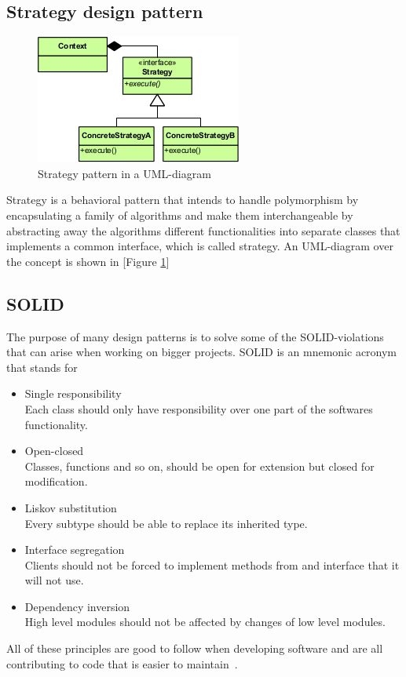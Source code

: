 \documentclass[conference, a4paper]{IEEEtran}
\begin{document}
\subsection{Strategy design pattern}
\label{sec:Strategy}
\begin{figure}[ht!]
	\centering
	\includegraphics[scale=0.7]{Strategy_Pattern_in_UML.png}
	\caption{Strategy pattern in a UML-diagram}
	\label{fig:Strategy}
\end{figure}
Strategy is a behavioral pattern that intends to handle polymorphism by encapsulating a family of algorithms and make them interchangeable by abstracting away the algorithms different functionalities into separate classes that implements a common interface, which is called strategy. An UML-diagram over the concept is shown in [Figure \ref{fig:Strategy}]
\\
\subsection{SOLID}
The purpose of many design patterns is to solve some of the SOLID-violations that can arise when working on bigger projects. SOLID is an mnemonic acronym that stands for
\begin{itemize}
    \item Single responsibility \\
    Each class should only have responsibility over one part of the softwares functionality.
    \item Open-closed \\
    Classes, functions and so on, should be open for extension but closed for modification.
    \item Liskov substitution \\
    Every subtype should be able to replace its inherited type.
    \item Interface segregation \\
    Clients should not be forced to implement methods from and interface that it will not use.
    \item Dependency inversion \\
    High level modules should not be affected by changes of low level modules.
\end{itemize}
All of these principles are good to follow when developing software and are all contributing to code that is easier to maintain~\cite{bibitem:Bob}.
\end{document}
